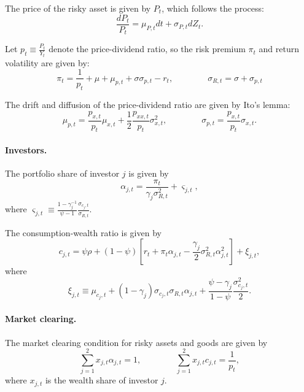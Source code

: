 \documentclass[11pt,english]{article}
\begin{document}
The price of the risky asset is given by $P_t$, which follows the process:
\begin{equation}
    \frac{d P_{t}}{P_t} = \mu_{P,t} dt + \sigma_{P,t} dZ_t.
\end{equation}

Let $p_t \equiv \frac{P_t}{Y_t}$ denote the price-dividend ratio, so the risk premium $\pi_t$ and return volatility are given by:
\begin{equation}
    \pi_t = \frac{1}{p_t} + \mu+\mu_{p,t} + \sigma \sigma_{p,t}  - r_t, \qquad \qquad
    \sigma_{R,t} = \sigma +\sigma_{p,t}
\end{equation}

The drift and diffusion of the price-dividend ratio are given by Ito's lemma:
\begin{equation}
    \mu_{p,t} =  \frac{p_{x,t}}{p_t} \mu_{x,t}+\frac{1}{2} \frac{p_{xx,t}}{p_t} \sigma_{x,t}^2, \qquad \qquad
    \sigma_{p,t} = \frac{p_{x,t}}{p_t} \sigma_{x,t}.
\end{equation}

\paragraph{Investors.} The portfolio share of investor $j$ is given by
\begin{equation}
    \alpha_{j,t} = \frac{\pi_t}{\gamma_j \sigma_{R,t}^2} + \varsigma_{j,t},
\end{equation}
where $\varsigma_{j,t} \equiv \frac{1-\gamma_j^{-1}}{\psi-1} \frac{\sigma_{c_j,t}}{\sigma_{R,t}}$.

The consumption-wealth ratio is given by
\begin{equation}
    c_{j,t} = \psi \rho + (1-\psi) \left[ r_t + \pi_t \alpha_{j,t} - \frac{\gamma_j}{2} \sigma_{R,t}^2 \alpha_{j,t}^2 \right] + \xi_{j,t},
\end{equation}
where
\begin{equation}
    \xi_{j,t} \equiv \mu_{c_j,t} + (1-\gamma_j) \sigma_{c_j,t} \sigma_{R,t} \alpha_{j,t} + \frac{\psi-\gamma_j}{1-\psi} \frac{\sigma_{c_j,t}^2}{2}.
\end{equation}

\paragraph{Market clearing.} The market clearing condition for risky assets and goods are given by
\begin{equation}
    \sum_{j=1}^2 x_{j,t}\alpha_{j,t} = 1, \qquad \qquad 
    \sum_{j=1}^2 x_{j,t} c_{j,t} = \frac{1}{p_t},
\end{equation}
where $x_{j,t}$ is the wealth share of investor $j$.
\end{document}
